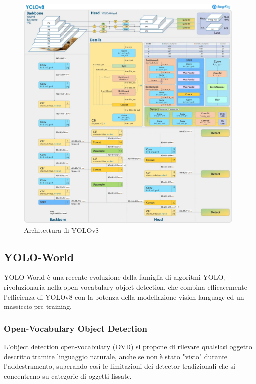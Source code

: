 \begin{figure}[ht]
    \centering
    \includegraphics[width=1\textwidth]{files/capitoli/2-yolo/assets/yolov8-architecture.png}
    \caption{\label{fig:yolov8-architecture}Architettura di YOLOv8\cite{28}}
\end{figure}

\newpage

\subsection{YOLO-World}
YOLO-World è una recente evoluzione della famiglia di algoritmi YOLO\cite{29}, rivoluzionaria nella open-vocabulary object detection, che combina efficacemente l'efficienza di YOLOv8 con la potenza della modellazione vision-language ed un massiccio pre-training.

\subsubsection{Open-Vocabulary Object Detection}
L'object detection open-vocabulary (OVD) si propone di rilevare qualsiasi oggetto descritto tramite linguaggio naturale, anche se non è stato "visto" durante l'addestramento, superando così le limitazioni dei detector tradizionali che si concentrano su categorie di oggetti fissate.

